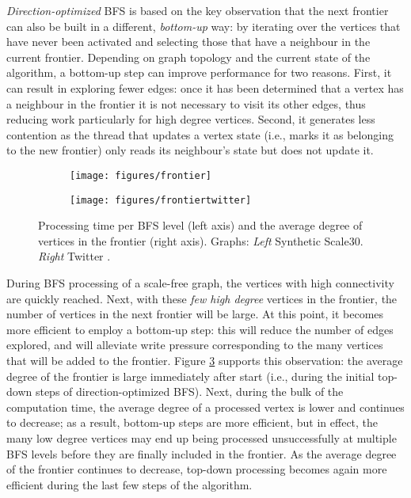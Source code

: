 \documentclass{llncs}
\begin{document}
\textit{Direction-optimized} BFS \cite{beamer2011searching} is based on the key observation that the next frontier can also be built in a different, \textit{bottom-up} way: by iterating over the vertices that have never been activated and selecting those that have a neighbour in the current frontier. Depending on graph topology and the current state of the algorithm, a bottom-up step can improve performance for two reasons. First, it can result in exploring fewer edges: once it has been determined that a vertex has a neighbour in the frontier it is not necessary to visit its other edges, thus reducing work particularly for high degree vertices. Second, it generates less contention as the thread that updates a vertex state (i.e., marks it as belonging to the new frontier) only reads its neighbour's state but does not update it.
\setlength{\textfloatsep}{-5pt}
\begin{figure}\centering \begin{subfigure}{.5\textwidth}\centering \texttt{[image: figures/frontier]}\label{fig:frontierscale30}\end{subfigure}\begin{subfigure}{.5\textwidth}\centering \texttt{[image: figures/frontiertwitter]}\label{fig:frontiertwitter}\end{subfigure}\caption{Processing time per BFS level (left axis) and the average degree of vertices in the frontier (right axis). Graphs: \textit{Left} Synthetic Scale30. \textit{Right} Twitter \cite{cha2010measuring}.}\label{fig:frontier}\end{figure}

During BFS processing of a scale-free graph, the vertices with high connectivity are quickly reached. Next, with these \textit{few high degree} vertices in the frontier, the number of vertices in the next frontier will be large. At this point, it becomes more efficient to employ a bottom-up step: this will reduce the number of edges explored, and will alleviate write pressure corresponding to the many vertices that will be added to the frontier. Figure \ref{fig:frontier} supports this observation: the average degree of the frontier is large immediately after start (i.e., during the initial top-down steps of direction-optimized BFS). Next, during the bulk of the computation time, the average degree of a processed vertex is lower and continues to decrease; as a result, bottom-up steps are more efficient, but in effect, the many low degree vertices may end up being processed unsuccessfully at multiple BFS levels before they are finally included in the frontier. As the average degree of the frontier continues to decrease, top-down processing becomes again more efficient during the last few steps of the algorithm.
\end{document}
